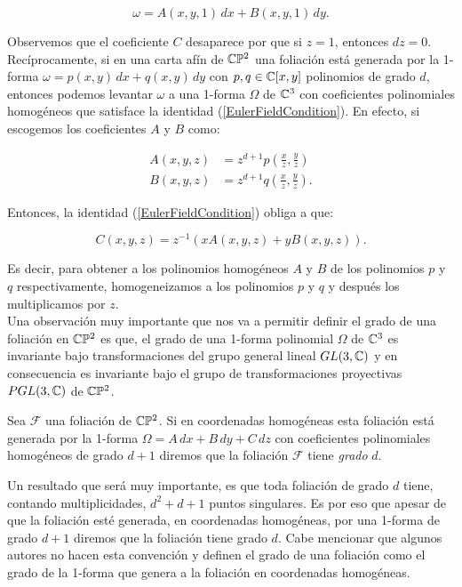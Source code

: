 \begin{equation}
\label{FormaAfin}
\omega=A(x,y,1)\, dx+B(x,y,1)\, dy.
\end{equation}

\noindent Observemos que el coeficiente $C$ desaparece por que si $z=1$, entonces $dz=0$.\\

Recíprocamente, si en una carta afín de $\mathbb{C}\mathbb{P}^{2}$ una foliación está generada por la 1-forma $\omega=p(x,y)\, dx+q(x,y)\, dy$ con $p,q\in\mathbb{C}[x,y]$ polinomios de grado $d$, entonces podemos levantar $\omega$ a una 1-forma $\Omega$ de $\mathbb{C}^{3}$ con coeficientes polinomiales homogéneos que satisface la identidad (\ref{EulerFieldCondition}). En efecto, si escogemos los coeficientes $A$ y $B$ como:

\begin{align}
A(x,y,z) &=z^{d+1}p(\tfrac{x}{z},\tfrac{y}{z})\\
B(x,y,z) &=z^{d+1}q(\tfrac{x}{z},\tfrac{y}{z}).
\end{align}

\noindent Entonces, la identidad (\ref{EulerFieldCondition}) obliga a que:

\begin{equation}
C(x,y,z) = z^{-1}(xA(x,y,z)+yB(x,y,z)).
\end{equation}

\noindent Es decir, para obtener a los polinomios homogéneos $A$ y $B$ de los polinomios $p$
y $q$ respectivamente, homogeneizamos a los polinomios $p$ y $q$ y después los multiplicamos por $z$.\\

Una observación muy importante que nos va a permitir definir el grado de una foliación en $\mathbb{C}\mathbb{P}^{2}$ es que, el grado de una 1-forma polinomial $\Omega$ de $\mathbb{C}^{3}$ es invariante bajo transformaciones del grupo general lineal $GL(3,\mathbb{C})$ y en consecuencia es invariante bajo el grupo de transformaciones proyectivas $PGL(3,\mathbb{C})$ de $\mathbb{C}\mathbb{P}^{2}$.  

\begin{defn}
\label{GradoDeUnaFoliacion}
Sea $\mathcal{F}$ una foliación de $\mathbb{C}\mathbb{P}^{2}$. Si en coordenadas homogéneas esta foliación está generada por la 1-forma $\Omega=A\, dx+B\, dy+ C\, dz$ con coeficientes polinomiales homogéneos de grado $d+1$ diremos que la foliación $\mathcal{F}$ tiene \emph{grado} $d$. 
\end{defn} 

Un resultado que será muy importante, es que toda foliación de grado $d$ tiene, contando multiplicidades, $d^{2}+d+1$ puntos singulares. Es por eso que apesar de que la foliación esté generada, en coordenadas homogéneas, por una 1-forma de grado $d+1$ diremos que la foliación tiene grado $d$. Cabe mencionar que algunos autores no hacen esta convención y definen el grado de una foliación como el grado de la 1-forma que genera a la foliación en coordenadas homogéneas.\\

